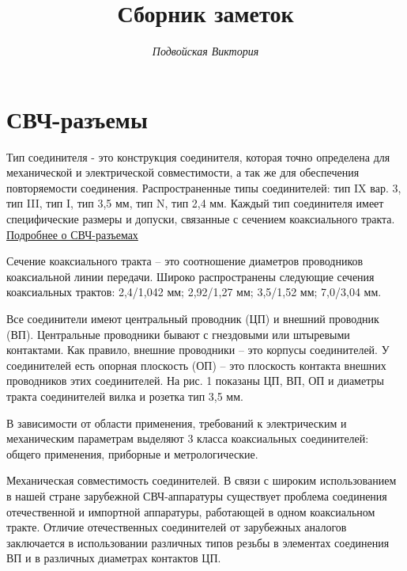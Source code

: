 \documentclass[%
	11pt,
	a4paper,
	utf8,
		]{article}
\begin{document}
\title{Сборник заметок}

\author{\itshape Подвойская Виктория}

\date{}
\maketitle

\thispagestyle{fancy}

\tableofcontents

\listoffigures

\section{СВЧ-разъемы}

Тип соединителя - это конструкция соединителя, которая точно определена для механической и электрической совместимости, а так же для обеспечения повторяемости соединения. Распространенные типы соединителей: тип IX вар. 3, тип III, тип I, тип 3,5 мм, тип N, тип 2,4 мм. Каждый тип соединителя имеет специфические размеры и допуски, связанные с сечением коаксиального тракта. \href{https://www.micran.ru/productions/Accessory/connectors}{Подробнее о СВЧ-разъемах}

Сечение коаксиального тракта – это соотношение диаметров проводников коаксиальной линии передачи. Широко распространены следующие сечения коаксиальных трактов: 2,4/1,042 мм; 2,92/1,27 мм; 3,5/1,52 мм; 7,0/3,04 мм.

Все соединители имеют центральный проводник (ЦП) и внешний проводник (ВП). Центральные проводники бывают с гнездовыми или штыревыми контактами. Как правило, внешние проводники – это корпусы соединителей. У соединителей есть опорная плоскость (ОП) – это плоскость контакта внешних проводников этих соединителей. На рис. 1 показаны ЦП, ВП, ОП и диаметры тракта соединителей вилка и розетка тип 3,5 мм.

В зависимости от области применения, требований к электрическим и механическим параметрам выделяют 3 класса коаксиальных соединителей: общего применения, приборные и метрологические.

Механическая совместимость соединителей. В связи с широким использованием в нашей стране зарубежной СВЧ-аппаратуры существует проблема соединения отечественной и импортной аппаратуры, работающей в одном коаксиальном тракте. Отличие отечественных соединителей от зарубежных аналогов заключается в использовании различных типов резьбы в элементах соединения ВП и в различных диаметрах контактов ЦП.
\end{document}
